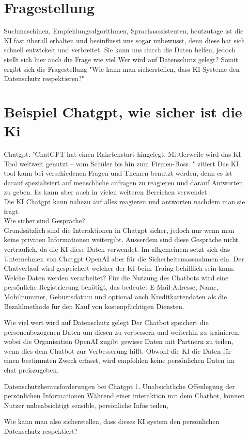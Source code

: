 \documentclass{article}
\begin{document}
    \section{Fragestellung}
    Suchmaschinen, Empfehlungsalgorithmen, Sprachaassistenten, heutzutage ist die KI fast überall erhalten und beeinflusst uns sogar unbewusst, denn diese hat sich schnell entwickelt und verbreitet. 
    Sie kann uns durch die Daten helfen, jedoch stellt sich hier auch die Frage wie viel Wer wird auf Datenschutz gelegt? 
    Somit ergibt sich die Fragestellung "Wie kann man sicherstellen, dass KI-Systeme den Datenschutz respektieren?"
\\


\section{Beispiel Chatgpt, wie sicher ist die Ki}
    Chatgpt: "ChatGPT hat einen Raketenstart hingelegt. Mittlerweile wird das KI-Tool weltweit genutzt – vom Schüler bis hin zum Firmen-Boss. " zitiert 
    Das KI tool kann bei verschiedenen Fragen und Themen benutzt werden, denn es ist darauf spezialisiert auf menschliche anfragen zu reagieren und darauf Antworten zu geben. 
    Es kann aber auch in vielen weiteren Bereichen verwendet.\\
    Die KI Chatgpt kann nahezu auf alles reagieren und antworten nachdem man sie fragt. 
\\
    Wie sicher sind Gespräche? \\
    Grundsätzlich sind die Interaktionen in Chatgpt sicher, jedoch nur wenn man keine privaten Informationen weitergibt. Ausserdem sind diese Gespräche nicht vertraulich, da die KI diese Daten verwendet.
    Im allgemeinem setzt sich das Unternehmen von Chatgpt OpenAI aber für die Sicherheitsmassnahmen ein.
    Der Chatverlauf wird gespeichert welcher der KI beim Traing behilflich sein kann.
    Welche Daten werden verarbeitet? 
    Für die Nutzung des Chatbots wird eine persönliche Registrierung benötigt, das bedeutet E-Mail-Adresse, Name, Mobilnummer, Geburtsdatum und optional auch Kreditkartendaten als die Bezahlmethode für den Kauf von kostenpflichtigen Diensten.

    Wie viel wert wird auf Datenschutz gelegt
    Der Chatbot speichert die personenbezogenen Daten um diesen zu verbessern und weiterhin zu trainieren, wobei die Organisation OpenAI zugibt gewisse Daten mit Partnern zu teilen, wenn dies dem Chatbot zur Verbesserung hilft.
    Obwohl die KI die Daten für einen bestimmten Zweck erfasst, wird empfohlen keine persönlichen Daten im chat preiszugeben.

Datenschutzherausforderungen bei Chatgpt 
1. Unabsichtliche Offenlegung der persönlichen Informationen
Während einer interaktion mit dem Chatbot, können Nutzer unbeabsichtigt sensible, persönliche Infos teilen,  

Wie kann man also sicherstellen, dass dieses KI system den persönlichen Datenschutz respektiert?





\printbibliography
\end{document}
